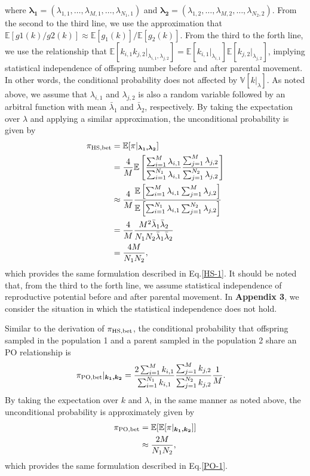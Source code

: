 \documentclass[12pt, English]{article}
\begin{document}
\begin{spacing}{1.9}
where $\boldsymbol{\lambda_1}=(\lambda_{1,1}, \ldots, \lambda_{M,1}, \ldots, \lambda_{N_1,1})$ and $\boldsymbol{\lambda_2}=(\lambda_{1,2}, \ldots, \lambda_{M,2}, \ldots, \lambda_{N_2,2})$. From the second to the third line, we use the approximation that $\mathbb{E}[g1(k)/g2(k)] \approx \mathbb{E}[g_1(k)] / \mathbb{E}[g_2(k)]$. From the third to the forth line, we use the relationship that $\mathbb{E}[k_{i,1}k_{j,2} | _{\lambda_{i,1}, \lambda_{j,2}}] = \mathbb{E}[k_{i,1}|_{\lambda_{i,1}}]\mathbb{E}[k_{j,2}|_{\lambda_{j,2}}]$, implying statistical independence of offspring number before and after parental movement. In other words, the conditional probability does not affected by $\mathbb{V}[k|_\lambda]$. As noted above, we assume that $\lambda_{i,1}$ and $\lambda_{j,2}$ is also a random variable followed by an arbitral function with mean ${\bar \lambda_{1}}$ and ${\bar \lambda_{2}}$, respectively. By taking the expectation over $\lambda$ and applying a similar approximation, the unconditional probability is given by
\begin{align}
\pi_{\rm HS,bet} &= \mathbb{E}[\pi | _{\boldsymbol{\lambda_1, \lambda_2}}] \nonumber\\ 
&= \frac{4}{M} \mathbb{E}\left[\frac{ \sum_{i=1}^M \lambda_{i,1} } { \sum_{i=1}^{N_1} \lambda_{i,1} } \frac{ \sum_{j=1}^M \lambda_{j,2} } { \sum_{j=1}^{N_2} \lambda_{j,2} } \right]   \nonumber\\
&\approx \frac{4}{M} \frac{ \mathbb{E}\left[ \sum_{i=1}^M \lambda_{i,1} \sum_{j=1}^M \lambda_{j,2} \right] } {\mathbb{E}\left[ \sum_{i=1}^{N_1} \lambda_{i,1} \sum_{j=1}^{N_2} \lambda_{j,2}\right]} \nonumber\\
&= \frac{4}{M} \frac{M^2 {\bar \lambda_1} {\bar \lambda_2}}{N_1 N_2 {\bar \lambda_1} {\bar \lambda_2}}\nonumber\\
&= \frac{4M}{N_{1}N_{2}},
\end{align}
which provides the same formulation described in Eq.\ref{HS-1}. It should be noted that, from the third to the forth line, we assume statistical independence of reproductive potential before and after parental movement. In {\bf Appendix 3}, we consider the situation in which the statistical independence does not hold. 

Similar to the derivation of $\pi_{\rm HS,bet}$, the conditional probability that offspring sampled in the population 1 and a parent sampled in the population 2 share an PO relationship is
\begin{align}
\pi_{\rm PO,bet} | _{\boldsymbol{k_1, k_2}} &= \frac{ 2\sum_{i=1}^M k_{i,1} } { \sum_{i=1}^{N_1} k_{i,1} } \frac{ \sum_{j=1}^M k_{j,2} } { \sum_{j=1}^{N_2} k_{j,2} } \frac{1}{M}.
\end{align}
By taking the expectation over $k$ and $\lambda$, in the same manner as noted above, the unconditional probability is approximately given by
\begin{align}
\pi_{\rm PO,bet} &= \mathbb{E}[\mathbb{E}[\pi | _{\boldsymbol{k_1, k_2}}]] \nonumber\\ 
&\approx  \frac{2M}{N_{1}N_{2}},
\end{align}
which provides the same formulation described in Eq.\ref{PO-1}.


\end{spacing}
\end{document}
